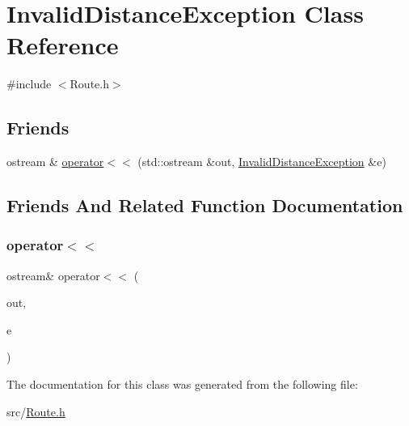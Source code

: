 \hypertarget{classInvalidDistanceException}{}\section{Invalid\+Distance\+Exception Class Reference}
\label{classInvalidDistanceException}


{\ttfamily \#include $<$Route.\+h$>$}

\subsection*{Friends}
\begin{DoxyCompactItemize}
\item 
ostream \& \hyperlink{classInvalidDistanceException_a66a9d7f1c3f796754d1c8dedc34697da}{operator$<$$<$} (std\+::ostream \&out, \hyperlink{classInvalidDistanceException}{Invalid\+Distance\+Exception} \&e)
\end{DoxyCompactItemize}


\subsection{Friends And Related Function Documentation}
\hypertarget{classInvalidDistanceException_a66a9d7f1c3f796754d1c8dedc34697da}{}\label{classInvalidDistanceException_a66a9d7f1c3f796754d1c8dedc34697da} 
\subsubsection{\texorpdfstring{operator$<$$<$}{operator<<}}
{\footnotesize\ttfamily ostream\& operator$<$$<$ (\begin{DoxyParamCaption}\item[{std\+::ostream \&}]{out,  }\item[{\hyperlink{classInvalidDistanceException}{Invalid\+Distance\+Exception} \&}]{e }\end{DoxyParamCaption})\hspace{0.3cm}{\ttfamily [friend]}}



The documentation for this class was generated from the following file\+:\begin{DoxyCompactItemize}
\item 
src/\hyperlink{Route_8h}{Route.\+h}\end{DoxyCompactItemize}
